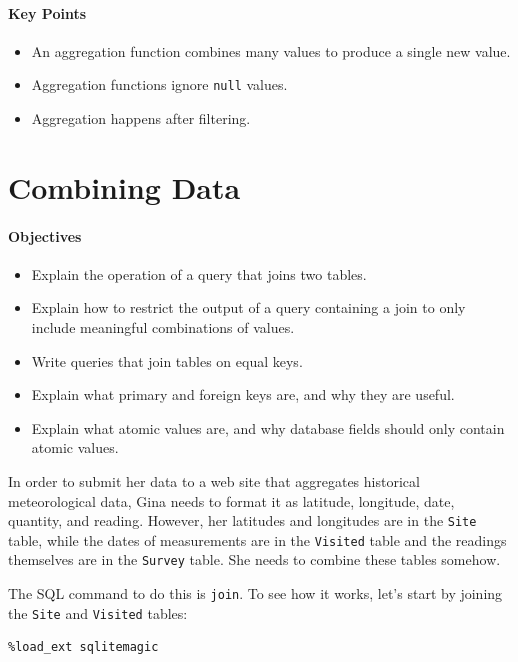 \documentclass[]{book}
\begin{document}
\mbox{}\paragraph{Key Points}

\begin{itemize}
\item
  An aggregation function combines many values to produce a single new
  value.
\item
  Aggregation functions ignore \texttt{null} values.
\item
  Aggregation happens after filtering.
\end{itemize}

\section{Combining Data}

\mbox{}\paragraph{Objectives}

\begin{itemize}
\item
  Explain the operation of a query that joins two tables.
\item
  Explain how to restrict the output of a query containing a join to
  only include meaningful combinations of values.
\item
  Write queries that join tables on equal keys.
\item
  Explain what primary and foreign keys are, and why they are useful.
\item
  Explain what atomic values are, and why database fields should only
  contain atomic values.
\end{itemize}

In order to submit her data to a web site that aggregates historical
meteorological data, Gina needs to format it as latitude, longitude,
date, quantity, and reading. However, her latitudes and longitudes are
in the \texttt{Site} table, while the dates of measurements are in the
\texttt{Visited} table and the readings themselves are in the
\texttt{Survey} table. She needs to combine these tables somehow.

The SQL command to do this is \texttt{join}. To see how it works, let's
start by joining the \texttt{Site} and \texttt{Visited} tables:

\begin{verbatim}
%load_ext sqlitemagic
\end{verbatim}
\end{document}
